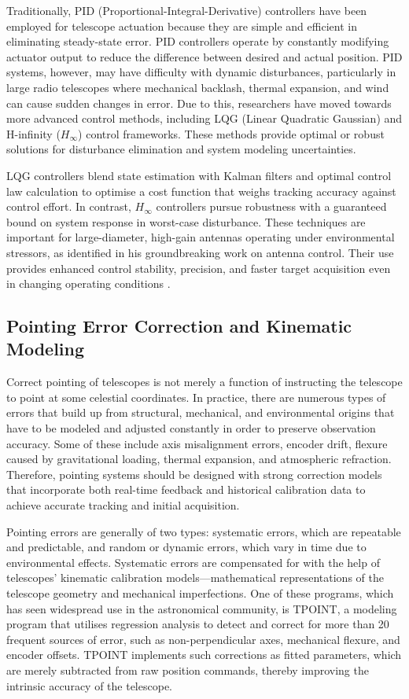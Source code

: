     Traditionally, PID (Proportional-Integral-Derivative) controllers have been employed for telescope actuation because they are simple and efficient in eliminating steady-state error. PID controllers operate by constantly modifying actuator output to reduce the difference between desired and actual position. PID systems, however, may have difficulty with dynamic disturbances, particularly in large radio telescopes where mechanical backlash, thermal expansion, and wind can cause sudden changes in error. Due to this, researchers have moved towards more advanced control methods, including LQG (Linear Quadratic Gaussian) and H-infinity ($H_\infty$) control frameworks. These methods provide optimal or robust solutions for disturbance elimination and system modeling uncertainties.

    LQG controllers blend state estimation with Kalman filters and optimal control law calculation to optimise a cost function that weighs tracking accuracy against control effort. In contrast, $H_\infty$ controllers pursue robustness with a guaranteed bound on system response in worst-case disturbance. These techniques are important for large-diameter, high-gain antennas operating under environmental stressors, as \cite{Gawronski2007} identified in his groundbreaking work on antenna control. Their use provides enhanced control stability, precision, and faster target acquisition even in changing operating conditions \cite{Gawronski2007}.

    \subsection{Pointing Error Correction and Kinematic Modeling}
    Correct pointing of telescopes is not merely a function of instructing the telescope to point at some celestial coordinates. In practice, there are numerous types of errors that build up from structural, mechanical, and environmental origins that have to be modeled and adjusted constantly in order to preserve observation accuracy. Some of these include axis misalignment errors, encoder drift, flexure caused by gravitational loading, thermal expansion, and atmospheric refraction. Therefore, pointing systems should be designed with strong correction models that incorporate both real-time feedback and historical calibration data to achieve accurate tracking and initial acquisition.

    Pointing errors are generally of two types: systematic errors, which are repeatable and predictable, and random or dynamic errors, which vary in time due to environmental effects. Systematic errors are compensated for with the help of telescopes' kinematic calibration models—mathematical representations of the telescope geometry and mechanical imperfections. One of these programs, which has seen widespread use in the astronomical community, is TPOINT, a modeling program that utilises regression analysis to detect and correct for more than 20 frequent sources of error, such as non-perpendicular axes, mechanical flexure, and encoder offsets. TPOINT implements such corrections as fitted parameters, which are merely subtracted from raw position commands, thereby improving the intrinsic accuracy of the telescope.

